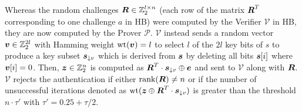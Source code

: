 \documentclass[11pt,a4paper]{article}
\begin{document}
Whereas the random challenges $\boldsymbol{R} \in \mathbb{Z}_2^{l \times n}$ (each row of the matrix $\boldsymbol{R}^T$ corresponding to one challenge $a$ in HB) were computed by the Verifier $\mathcal{V}$ in HB, they are now computed by the Prover $\mathcal{P}$.
$\mathcal{V}$ instead sends a random vector $\boldsymbol{v} \in \mathbb{Z}_2^{2l}$ with Hamming weight $\text{wt}(\boldsymbol{v}) = l$ to select $l$ of the $2l$ key bits of $s$ to produce a key subset $\boldsymbol{s}_{\downarrow v}$ which is derived from $\boldsymbol{s}$ by deleting all bits $\boldsymbol{s}[i]$ where $\boldsymbol{v}[i] = 0$.
Then, $\boldsymbol{z} \in \mathbb{Z}_2^n$ is computed as $\boldsymbol{R}^T \cdot \boldsymbol{s}_{\downarrow v} \oplus \boldsymbol{e}$ and sent to $\mathcal{V}$ along with $\boldsymbol{R}$.
$\mathcal{V}$ rejects the authentication if either $\text{rank}(\boldsymbol{R}) \neq n$ or if the number of unsuccessful iterations denoted as $\text{wt}(\boldsymbol{z} \oplus \boldsymbol{R}^T \cdot \boldsymbol{s}_{\downarrow v})$ is greater than the threshold $n \cdot \tau'$ with $\tau' = 0.25 + \tau/2$.




\newpage
{}


\end{document}
